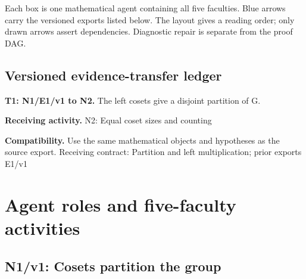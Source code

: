 \documentclass[preprint,12pt,aps,pra,showkeys,amsmath,amssymb,superscriptaddress,floatfix]{revtex4-2}
\theoremstyle{definition}
\theoremstyle{remark}
\newcommand{\field}[2]{\par\smallskip\noindent\textbf{#1.} #2\par}
\begin{document}
\begin{center}\end{center}

Each box is one mathematical agent containing all five faculties. Blue
arrows carry the versioned exports listed below. The layout gives a
reading order; only drawn arrows assert dependencies. Diagnostic repair
is separate from the proof DAG.

\subsection{Versioned evidence-transfer ledger}

\begingroup\small\linespread{1.05}\selectfont

\field{T1: N1/E1/v1 to N2}{The left cosets give a disjoint partition of G.}

\field{Receiving activity}{N2: Equal coset sizes and counting}

\field{Compatibility}{Use the same mathematical objects and hypotheses as the source export.
Receiving contract: Partition and left multiplication; prior exports
E1/v1}

\endgroup

\clearpage\section{Agent roles and five-faculty activities}\begingroup\small\linespread{1.05}\selectfont{}

\subsection{N1/v1: Cosets partition the group}
\end{document}
